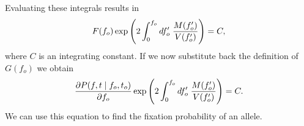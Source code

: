 Evaluating these integrals results in
\begin{equation}
	F(f_o) \exp \left(
	2 \int_0^{f_o} df_o' \; {M(f_o') \over V(f_o')}
	\right) = C,
\end{equation}
where $C$ is an integrating constant. If we now substitute back the definition
of $G(f_o)$ we obtain
\begin{equation}
	{\partial P(f, t \mid f_o, t_o) \over \partial f_o}
	\exp \left(
	2 \int_0^{f_o} df_o' \; {M(f_o') \over V(f_o')}
	\right) = C.
\end{equation}
We can use this equation to find the fixation probability of an allele.

